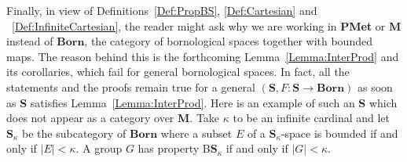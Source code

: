 \documentclass[a4paper]{article}
\newtheorem{prop}[lem]{Proposition}
\theoremstyle{definition}
\newtheorem{rem}[lem]{Remark}
\newcommand*{\category}[1]{\textbf{#1}}
\newcommand*{\PMet}{\category{PMet}}
\newcommand*{\CatS}{\category{S}}
\newcommand*{\BS}{B\textbf{S}}
\begin{document}
Finally, in view of Definitions~\ref{Def:PropBS}, \ref{Def:Cartesian} and ~\ref{Def:InfiniteCartesian}, the reader might ask why we are working in \PMet{} or $\category{M}$ instead of $\category{Born}$, the category of bornological spaces together with bounded maps.
The reason behind this is the forthcoming Lemma~\ref{Lemma:InterProd} and its corollaries, which fail for general bornological spaces.
In fact, all the statements and the proofs remain true for a general $(\CatS,F\colon\CatS\to \category{Born})$ as soon as \CatS{} satisfies Lemma~\ref{Lemma:InterProd}.
Here is an example of such an \CatS{} which does not appear as a category over \category{M}.
Take $\kappa$ to be an infinite cardinal and let $\mathbf{S}_\kappa$ be the subcategory of $\category{Born}$ where a subset $E$ of a $\mathbf{S}_\kappa$-space is bounded if and only if $\lvert E\rvert<\kappa$.
A group $G$ has property B$\mathbf{S}_\kappa$ if and only if $\lvert G\rvert<\kappa$.
%
%
%
%
\end{document}
